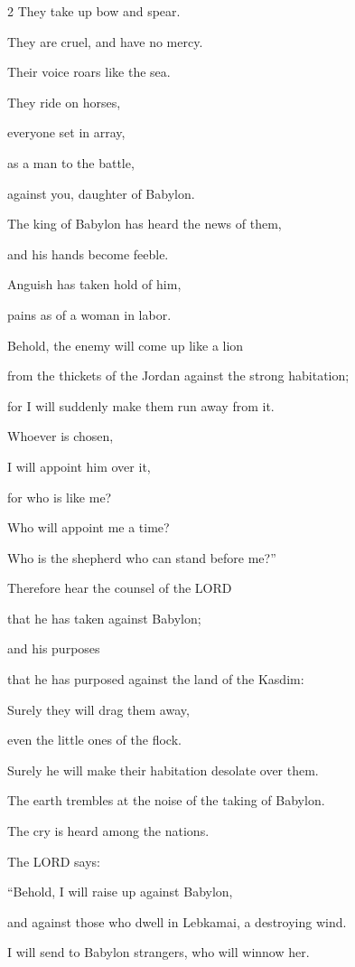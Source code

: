 \begin{multicols}{2}
\myverse{}They take up bow and spear.

They are cruel, and have no mercy.

Their voice roars like the sea.

They ride on horses,

everyone set in array,

as a man to the battle,

against you, daughter of Babylon.


\myverse{}The king of Babylon has heard the news of them,

and his hands become feeble.

Anguish has taken hold of him,

pains as of a woman in labor.


\myverse{}Behold, the enemy will come up like a lion

from the thickets of the Jordan against the strong habitation;

for I will suddenly make them run away from it.

Whoever is chosen,

I will appoint him over it,

for who is like me?

Who will appoint me a time?

Who is the shepherd who can stand before me?”


\myverse{}Therefore hear the counsel of the LORD

that he has taken against Babylon;

and his purposes

that he has purposed against the land of the Kasdim:

Surely they will drag them away,

even the little ones of the flock.

Surely he will make their habitation desolate over them.


\myverse{}The earth trembles at the noise of the taking of Babylon.

The cry is heard among the nations.


\mychapter{} \myverse*{}The LORD says:

\quad“Behold, I will raise up against Babylon,

and against those who dwell in Lebkamai, a destroying wind.


\myverse{}I will send to Babylon strangers, who will winnow her.


\end{multicols}
